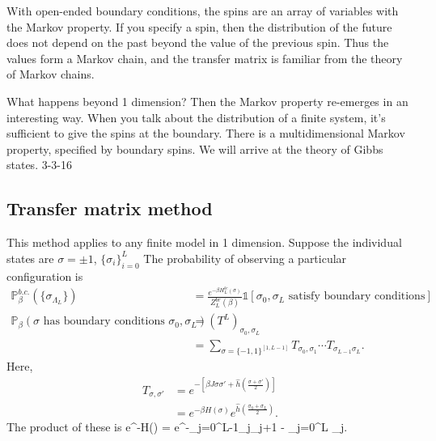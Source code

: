 \documentclass[12pt]{book}
\theoremstyle{norm}
\begin{document}
With open-ended boundary conditions, the spins are an array of variables with the Markov property. If you specify a spin, then the distribution of the future does not depend on the past beyond the value of the previous spin. Thus the values form a Markov chain, and the transfer matrix is familiar from the theory of Markov chains. 

What happens beyond 1 dimension? Then the Markov property re-emerges in an interesting way. When you talk about the distribution of a finite system, it's sufficient to give the spins at the boundary. 
There is a multidimensional Markov property, specified by boundary spins. %
We will arrive at the theory of Gibbs states.
{\color{blue}3-3-16}

\subsection{Transfer matrix method}

This method applies to any finite model in 1 dimension. Suppose the individual states are $\sigma=\pm1$, $\{\sigma_i\}_{i=0}^L$
The probability of observing a particular configuration is %
\begin{align}
\mathbb{P}_\beta^{b.c.}(\{\sigma_{\Lambda_L}\}) &= \frac{e^{-\beta H_L^{bc}(\sigma)}}{Z_L^{br}(\beta)}\mathds{1}[\sigma_0,\sigma_L\text{ satisfy boundary conditions}]\\
\mathbb{P}_\beta(\sigma\text{ has boundary conditions } \sigma_0,\sigma_L)&=(T^L)_{\sigma_0,\sigma_L} \\
&= \sum_{\sigma =\{-1,1\}^{[1,L-1]}} T_{\sigma_0,\sigma_1}\cdots T_{\sigma_{L-1}\sigma_L}.
\end{align}
Here, 
\begin{align}
T_{\sigma,\sigma'} &= e^{-\left[ {\beta J \sigma\sigma' + \widehat{h}\left( {\frac{\sigma+\sigma'}{2}} \right)} \right]}\\
&= e^{-\beta H(\sigma)} e^{\widehat{h}\left( {\frac{\sigma_0+\sigma_L}{2}} \right)}.
\end{align}
The product of these is
\be
e^{-\beta H(\sigma)} = e^{-\beta \sum_{j=0}^{L-1}\sigma_j\sigma_{j+1} -  \sum_{j=0}^L \sigma_j}.
\ee
\end{document}
